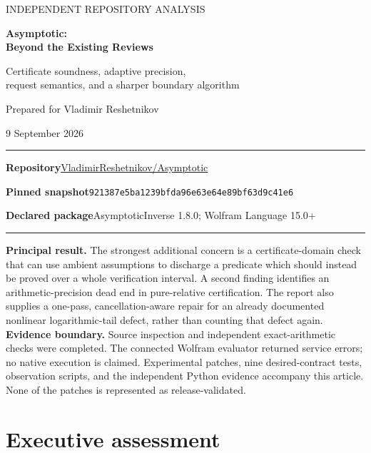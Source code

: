 \documentclass[11pt,a4paper]{article}
\newcommand{\snapshot}{\texttt{921387e5ba1239bfda96e63e64e89bf63d9c41e6}}
\begin{document}
\begin{titlepage}
\vspace*{12mm}
{\sffamily\color{accent}\Large INDEPENDENT REPOSITORY ANALYSIS\par}
\vspace{10mm}
{\sffamily\bfseries\color{ink}\fontsize{30}{36}\selectfont Asymptotic:\\Beyond the Existing Reviews\par}
\vspace{7mm}
{\sffamily\fontsize{18}{24}\selectfont Certificate soundness, adaptive precision,\\request semantics, and a sharper boundary algorithm\par}
\vspace{15mm}
{\large Prepared for Vladimir Reshetnikov\par}
{\large 9 September 2026\par}
\vspace{10mm}\hrule\vspace{4mm}
\textbf{Repository}\quad\href{https://github.com/VladimirReshetnikov/Asymptotic}{VladimirReshetnikov/Asymptotic}\par
\textbf{Pinned snapshot}\quad\snapshot\par
\textbf{Declared package}\quad AsymptoticInverse 1.8.0; Wolfram Language 15.0+\par
\vspace{4mm}\hrule
\vspace{9mm}
\textbf{Principal result.} The strongest additional concern is a certificate-domain check that can use ambient assumptions to discharge a predicate which should instead be proved over a whole verification interval. A second finding identifies an arithmetic-precision dead end in pure-relative certification. The report also supplies a one-pass, cancellation-aware repair for an already documented nonlinear logarithmic-tail defect, rather than counting that defect again.
\vfill
\small\textbf{Evidence boundary.} Source inspection and independent exact-arithmetic checks were completed. The connected Wolfram evaluator returned service errors; no native execution is claimed. Experimental patches, nine desired-contract tests, observation scripts, and the independent Python evidence accompany this article. None of the patches is represented as release-validated.
\end{titlepage}
\begingroup\footnotesize\setlength{\parskip}{0pt}\tableofcontents\endgroup
\clearpage

\section{Executive assessment}
\end{document}
